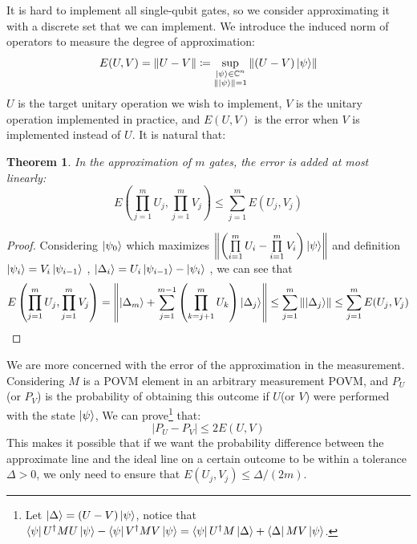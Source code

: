 \documentclass[a4paper,10pt]{book}
\newtheorem{theorem}{Theorem}[section]
\numberwithin{equation}{section}
\begin{document}
It is hard to implement all single-qubit gates, so we consider approximating it with a discrete set that we can implement. We introduce the induced norm of operators to measure the degree of approximation:
\begin{equation}
    E(U,V) = \left\| U-V \right\| \coloneqq \sup\limits_{\substack{\ket{\psi} \in \mathbb{C}^{n} \\ \left\| \ket{\psi} \right\| = 1}} \left\| (U-V)\ket{\psi} \right\|
\end{equation}
$U$ is the target unitary operation we wish to implement, $V$ is the unitary operation implemented in practice, and $E(U,V)$ is the error when $V$ is implemented instead of $U$. It is natural that:
\begin{theorem}
    In the approximation of $m$ gates, the error is added at most linearly:
    \begin{equation}
        E\left(\prod\limits_{j=1}^{m}U_{j},\prod\limits_{j=1}^{m}V_{j}\right) \leq \sum_{j=1}^{m} E(U_{j},V_{j})
    \end{equation}
\end{theorem}
\begin{proof}
    Considering $\ket{\psi_{0}}$ which maximizes $\left\|\left(\prod\limits_{i=1}^{m}U_{i} -  \prod\limits_{i=1}^{m}V_{i}\right)\ket{\psi}\right\|$ and definition $\ket{\psi_{i}} = V_{i}\ket{\psi_{i-1}}$ , $\ket{\Delta_{i}} = U_{i}\ket{\psi_{i-1}} - \ket{\psi_{i}}$ , we can see that
    \begin{equation*}
        E\left(\prod_{j=1}^{m}U_{j},\prod\limits_{j=1}^{m}V_{j}\right) = \left\|\ket{\Delta_{m}} + \sum\limits_{j=1}^{m-1} \left(\prod_{k=j+1}^{m}U_{k}\right)\ket{\Delta_{j}}\right\| \leq \sum\limits_{j=1}^{m} \left\|\ket{\Delta_{j}}\right\| \leq \sum_{j=1}^{m} E(U_{j},V_{j}) \qedhere
    \end{equation*}
\end{proof}


We are more concerned with the error of the approximation in the measurement. Considering $M$ is a POVM element in an arbitrary measurement POVM, and $P_{U}$(or $P_{V}$) is the probability of obtaining this outcome if $U$(or $V$) were performed with the state $\ket{\psi}$, We can prove\footnote{Let $\ket{\Delta} = (U-V)\ket{\psi}$, notice that $\bra{\psi}U^{\dagger}MU\ket{\psi} - \bra{\psi}V^{\dagger}MV\ket{\psi} = \bra{\psi}U^{\dagger}M\ket{\Delta} + \bra{\Delta}MV\ket{\psi}$. } that:
\begin{equation}
    \left| P_{U} - P_{V} \right| \leq 2E(U,V)
\end{equation}
This makes it possible that if we want the probability difference between the approximate line and the ideal line on a certain outcome to be within a tolerance $\Delta > 0$, we only need to ensure that $E(U_{j},V_{j}) \leq \Delta/(2m)$.
\end{document}
